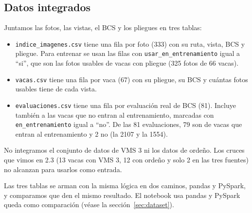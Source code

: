 \subsection{Datos integrados}

Juntamos las fotos, las vistas, el BCS y los pliegues en tres tablas:

\begin{itemize}
  \item \nolinkurl{indice_imagenes.csv} tiene una fila por foto (333) con su ruta, vista, BCS y pliegue. Para entrenar se usan las filas con \texttt{usar\_en\_entrenamiento} igual a ``si'', que son las fotos usables de vacas con pliegue (325 fotos de 66 vacas).
  \item \nolinkurl{vacas.csv} tiene una fila por vaca (67) con su pliegue, su BCS y cuántas fotos usables tiene de cada vista.
  \item \nolinkurl{evaluaciones.csv} tiene una fila por evaluación real de BCS (81). Incluye también a las vacas que no entran al entrenamiento, marcadas con \texttt{en\_entrenamiento} igual a ``no''. De las 81 evaluaciones, 79 son de vacas que entran al entrenamiento y 2 no (la 2107 y la 1554).
\end{itemize}

No integramos el conjunto de datos de VMS 3 ni los datos de ordeño. Los cruces que vimos en 2.3 (13 vacas con VMS 3, 12 con ordeño y solo 2 en las tres fuentes) no alcanzan para usarlos como entrada.

Las tres tablas se arman con la misma lógica en dos caminos, pandas y PySpark, y comparamos que den el mismo resultado. El notebook usa pandas y PySpark queda como comparación (véase la sección~\ref{sec:dataset}).
